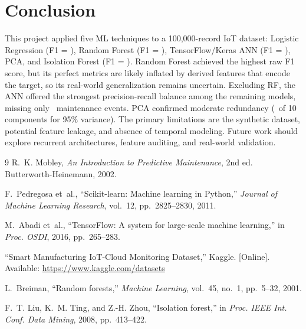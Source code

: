\documentclass[11pt]{article}
\begin{document}
\section{Conclusion}

This project applied five ML techniques to a 100,000-record IoT dataset: Logistic Regression (F1 = \lrFone), Random Forest (F1 = \rfFone), TensorFlow/Keras ANN (F1 = \annFone), PCA, and Isolation Forest (F1 = \isoFone). Random Forest achieved the highest raw F1 score, but its perfect metrics are likely inflated by derived features that encode the target, so its real-world generalization remains uncertain. Excluding RF, the ANN offered the strongest precision-recall balance among the remaining models, missing only \annFN\ maintenance events. PCA confirmed moderate redundancy (\pcaNcomp\ of 10 components for 95\% variance). The primary limitations are the synthetic dataset, potential feature leakage, and absence of temporal modeling. Future work should explore recurrent architectures, feature auditing, and real-world validation.

\begin{thebibliography}{9}
R.~K. Mobley, \textit{An Introduction to Predictive Maintenance}, 2nd ed. Butterworth-Heinemann, 2002.

F.~Pedregosa et~al., ``Scikit-learn: Machine learning in Python,'' \textit{Journal of Machine Learning Research}, vol.~12, pp.~2825--2830, 2011.

M.~Abadi et~al., ``TensorFlow: A system for large-scale machine learning,'' in \textit{Proc. OSDI}, 2016, pp.~265--283.

``Smart Manufacturing IoT-Cloud Monitoring Dataset,'' Kaggle. [Online]. Available: \url{https://www.kaggle.com/datasets}

L.~Breiman, ``Random forests,'' \textit{Machine Learning}, vol.~45, no.~1, pp.~5--32, 2001.

F.~T. Liu, K.~M. Ting, and Z.-H. Zhou, ``Isolation forest,'' in \textit{Proc. IEEE Int. Conf. Data Mining}, 2008, pp.~413--422.
\end{thebibliography}
\end{document}
